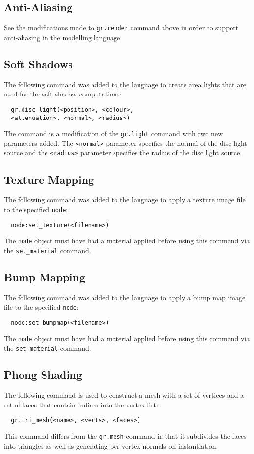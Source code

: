 \subsection*{Anti-Aliasing}
See the modifications made to \verb|gr.render| command above in order to support
anti-aliasing in the modelling language.

\subsection*{Soft Shadows}
The following command was added to the language to create area lights that are
used for the soft shadow computations:
\begin{lstlisting}
  gr.disc_light(<position>, <colour>, 
  <attenuation>, <normal>, <radius>)
\end{lstlisting}
The command is a modification of the \verb|gr.light| command with two new
parameters added. The \verb|<normal>| parameter specifies the normal of the disc
light source and the \verb|<radius>| parameter specifies the radius of the disc
light source.

\subsection*{Texture Mapping}
The following command was added to the language to apply a texture image file
to the specified \verb|node|:
\begin{lstlisting}
  node:set_texture(<filename>)
\end{lstlisting}
The \verb|node| object must have had a material applied before using this
command via the \verb|set_material| command.

\subsection*{Bump Mapping}
The following command was added to the language to apply a bump map image file
to the specified \verb|node|:
\begin{lstlisting}
  node:set_bumpmap(<filename>)
\end{lstlisting}
The \verb|node| object must have had a material applied before using this
command via the \verb|set_material| command.

\subsection*{Phong Shading}
The following command is used to construct a mesh with a set of vertices and a
set of faces that contain indices into the vertex list:
\begin{lstlisting}
  gr.tri_mesh(<name>, <verts>, <faces>)
\end{lstlisting}
This command differs from the \verb|gr.mesh| command in that it subdivides the
faces into triangles as well as generating per vertex normals on instantiation.

